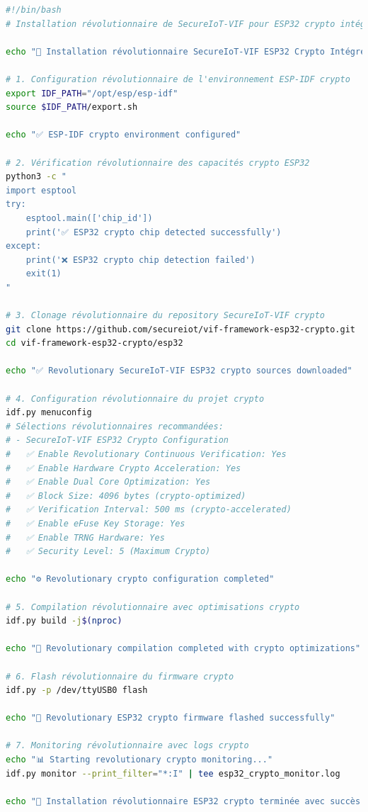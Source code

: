 \begin{lstlisting}[language=bash, caption={Script révolutionnaire d'installation pour ESP32 crypto intégré}]
#!/bin/bash
# Installation révolutionnaire de SecureIoT-VIF pour ESP32 crypto intégré

echo "🚀 Installation révolutionnaire SecureIoT-VIF ESP32 Crypto Intégré"

# 1. Configuration révolutionnaire de l'environnement ESP-IDF crypto
export IDF_PATH="/opt/esp/esp-idf"
source $IDF_PATH/export.sh

echo "✅ ESP-IDF crypto environment configured"

# 2. Vérification révolutionnaire des capacités crypto ESP32
python3 -c "
import esptool
try:
    esptool.main(['chip_id'])
    print('✅ ESP32 crypto chip detected successfully')
except:
    print('❌ ESP32 crypto chip detection failed')
    exit(1)
"

# 3. Clonage révolutionnaire du repository SecureIoT-VIF crypto
git clone https://github.com/secureiot/vif-framework-esp32-crypto.git
cd vif-framework-esp32-crypto/esp32

echo "✅ Revolutionary SecureIoT-VIF ESP32 crypto sources downloaded"

# 4. Configuration révolutionnaire du projet crypto
idf.py menuconfig
# Sélections révolutionnaires recommandées:
# - SecureIoT-VIF ESP32 Crypto Configuration
#   ✅ Enable Revolutionary Continuous Verification: Yes
#   ✅ Enable Hardware Crypto Acceleration: Yes
#   ✅ Enable Dual Core Optimization: Yes
#   ✅ Block Size: 4096 bytes (crypto-optimized)
#   ✅ Verification Interval: 500 ms (crypto-accelerated)
#   ✅ Enable eFuse Key Storage: Yes
#   ✅ Enable TRNG Hardware: Yes
#   ✅ Security Level: 5 (Maximum Crypto)

echo "⚙️ Revolutionary crypto configuration completed"

# 5. Compilation révolutionnaire avec optimisations crypto
idf.py build -j$(nproc)

echo "🔨 Revolutionary compilation completed with crypto optimizations"

# 6. Flash révolutionnaire du firmware crypto
idf.py -p /dev/ttyUSB0 flash

echo "📲 Revolutionary ESP32 crypto firmware flashed successfully"

# 7. Monitoring révolutionnaire avec logs crypto
echo "📊 Starting revolutionary crypto monitoring..."
idf.py monitor --print_filter="*:I" | tee esp32_crypto_monitor.log

echo "🎉 Installation révolutionnaire ESP32 crypto terminée avec succès!"
\end{lstlisting}

